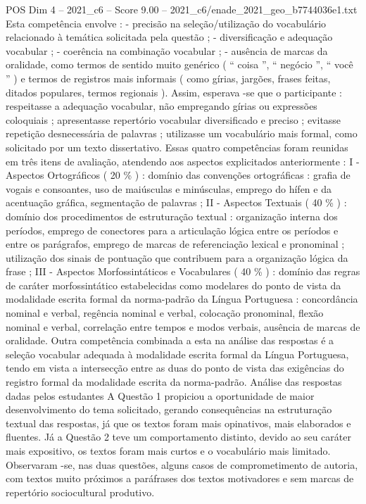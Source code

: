 \begin{textsample}{POS Dim 4 – 2021\_c6 – Score 9.00 – 2021\_c6/enade\_2021\_geo\_b7744036e1.txt}
Esta competência envolve : - precisão na seleção/utilização do vocabulário relacionado à temática solicitada pela questão ; - diversificação e adequação vocabular ; - coerência na combinação vocabular ; - ausência de marcas da oralidade, como termos de sentido muito genérico ( “ coisa ”, “ negócio ”, “ você ” ) e termos de registros mais informais ( como gírias, jargões, frases feitas, ditados populares, termos regionais ).
Assim, esperava -se que o participante : respeitasse a adequação vocabular, não empregando gírias ou expressões coloquiais ; apresentasse repertório vocabular diversificado e preciso ; evitasse repetição desnecessária de palavras ; utilizasse um vocabulário mais formal, como solicitado por um texto dissertativo.
Essas quatro competências foram reunidas em três itens de avaliação, atendendo aos aspectos explicitados anteriormente : I - Aspectos Ortográficos ( 20 \% ) : domínio das convenções ortográficas : grafia de vogais e consoantes, uso de maiúsculas e minúsculas, emprego do hífen e da acentuação gráfica, segmentação de palavras ; II - Aspectos Textuais ( 40 \% ) : domínio dos procedimentos de estruturação textual : organização interna dos períodos, emprego de conectores para a articulação lógica entre os períodos e entre os parágrafos, emprego de marcas de referenciação lexical e pronominal ; utilização dos sinais de pontuação que contribuem para a organização lógica da frase ; III - Aspectos Morfossintáticos e Vocabulares ( 40 \% ) : domínio das regras de caráter morfossintático estabelecidas como modelares do ponto de vista da modalidade escrita formal da norma-padrão da Língua Portuguesa : concordância nominal e verbal, regência nominal e verbal, colocação pronominal, flexão nominal e verbal, correlação entre tempos e modos verbais, ausência de marcas de oralidade.
Outra competência combinada a esta na análise das respostas é a seleção vocabular adequada à modalidade escrita formal da Língua Portuguesa, tendo em vista a intersecção entre as duas do ponto de vista das exigências do registro formal da modalidade escrita da norma-padrão.
Análise das respostas dadas pelos estudantes A Questão 1 propiciou a oportunidade de maior desenvolvimento do tema solicitado, gerando consequências na estruturação textual das respostas, já que os textos foram mais opinativos, mais elaborados e fluentes.
Já a Questão 2 teve um comportamento distinto, devido ao seu caráter mais expositivo, os textos foram mais curtos e o vocabulário mais limitado.
Observaram -se, nas duas questões, alguns casos de comprometimento de autoria, com textos muito próximos a paráfrases dos textos motivadores e sem marcas de repertório sociocultural produtivo.

\end{textsample}
